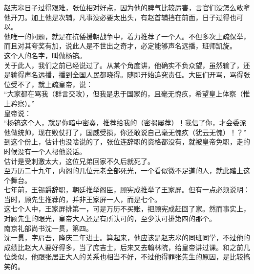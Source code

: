 \begin{multicols}{\theparacolNo}
赵志皋日子过得艰难，张位相对好点，因为他的脾气比较厉害，言官们没怎么敢拿他开刀。加上他是次辅，凡事没必要太出头，有赵首辅挡在前面，日子过得也可以。\\

他唯一的问题，就是在抗倭援朝战争中，着力推荐了一个人。不但多次上疏保举，而且对其夸奖有加，说此人是不世出之奇才，必定能够声名远播，班师凯旋。\\

这个人的名字，叫做杨镐。\\

关于此人，我们之前已经说过了。从某个角度讲，他确实不负众望，虽然输了，还是输得声名远播，播到全国人民都晓得。随即开始追究责任。大臣们开骂，骂得张位受不了，就上疏皇帝，说：\\

“大家都在骂我（群言交攻），但我是忠于国家的，且毫无愧疚，希望皇上体察（惟上矜察）。”\\

皇帝说：\\

“杨镐这个人，就是你暗中密奏，推荐给我的（密揭屡荐）！我信了你，才会委派他做统帅，现在败仗打了，国威受损，你还敢说自己毫无愧疚（犹云无愧）！？”\\

到这个份上，估计也没啥说的了，张位连辞职的资格都没有，就被皇帝免职，走的时候没有一个人帮他说话。\\

估计是受刺激太大，这位兄弟回家不久后就死了。\\

至万历二十九年，内阁的几位元老全部死光，一个看似微不足道的人，就此踏上这个舞台。\\

七年前，王锡爵辞职，朝廷推举阁臣，顾宪成推举了王家屏。但有一点必须说明：当时，顾先生推荐的，并非王家屏一人，而是七个。\\

这七个人中，王家屏排第一，可是万历不买账，把顾宪成赶回了家。然而事实上，对顾先生的眼光，皇帝大人还是有所认可的，至少认可排第四的那个。\\

南京礼部尚书沈一贯，第四。\\

沈一贯，字肩吾，隆庆二年进士。算起来，他应该是赵志皋的同班同学，不过他的成绩比赵大人要好得多，当了庶吉士，后来又去翰林院，给皇帝讲过课。和之前几位类似，他跟张居正大人的关系也相当不好，不过他得罪张先生的原因，是比较搞笑的。\\


\end{multicols}
